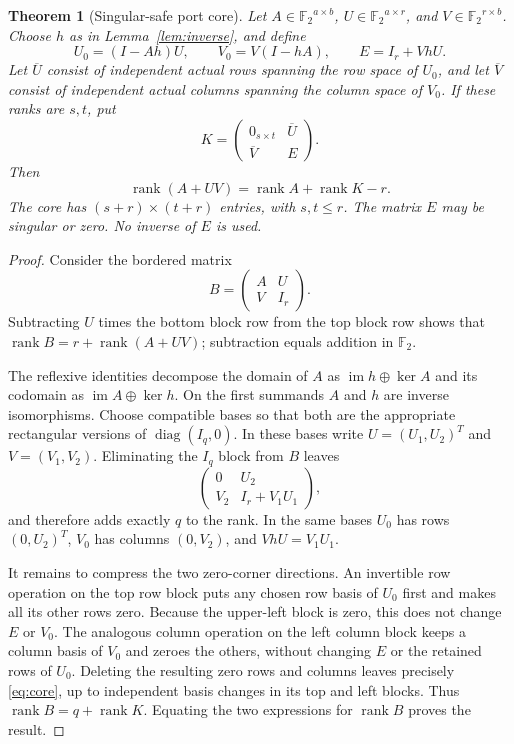 \documentclass[11pt,letterpaper]{article}
\newcommand{\F}{{\mathbb F_2}}
\newcommand{\rk}{\operatorname{rank}}
\newcommand{\im}{\operatorname{im}}
\newtheorem{theorem}{Theorem}[section]
\theoremstyle{definition}
\theoremstyle{remark}
\numberwithin{equation}{section}
\begin{document}
\begin{theorem}[Singular-safe port core]
\label{thm:border}
Let $A\in\F^{a\times b}$, $U\in\F^{a\times r}$, and
$V\in\F^{r\times b}$. Choose $h$ as in Lemma~\ref{lem:inverse}, and define
\begin{equation}
 U_0=(I-Ah)U,\qquad V_0=V(I-hA),\qquad E=I_r+VhU.
 \label{eq:residuals}
\end{equation}
Let $\overline U$ consist of independent actual rows spanning the row
space of $U_0$, and let $\overline V$ consist of independent actual
columns spanning the column space of $V_0$. If these ranks are $s,t$, put
\begin{equation}
 K=\begin{pmatrix}0_{s\times t}&\overline U\\
                   \overline V&E\end{pmatrix}.
 \label{eq:core}
\end{equation}
Then
\begin{equation}
 \boxed{\rk(A+UV)=\rk A+\rk K-r.}
 \label{eq:rankformula}
\end{equation}
The core has $(s+r)\times(t+r)$ entries, with $s,t\le r$. The matrix $E$
may be singular or zero. No inverse of $E$ is used.
\end{theorem}
\begin{proof}
Consider the bordered matrix
\[
 B=\begin{pmatrix}A&U\\V&I_r\end{pmatrix}.
\]
Subtracting $U$ times the bottom block row from the top block row shows
that $\rk B=r+\rk(A+UV)$; subtraction equals addition in $\F$.

The reflexive identities decompose the domain of $A$ as
$\im h\oplus\ker A$ and its codomain as $\im A\oplus\ker h$. On the
first summands $A$ and $h$ are inverse isomorphisms. Choose compatible
bases so that both are the appropriate rectangular versions of
$\operatorname{diag}(I_q,0)$. In these bases write
$U=(U_1,U_2)^T$ and $V=(V_1,V_2)$. Eliminating the $I_q$ block from $B$
leaves
\[
 \begin{pmatrix}0&U_2\\V_2&I_r+V_1U_1\end{pmatrix},
\]
and therefore adds exactly $q$ to the rank. In the same bases $U_0$ has
rows $(0,U_2)^T$, $V_0$ has columns $(0,V_2)$, and $VhU=V_1U_1$.

It remains to compress the two zero-corner directions. An invertible row
operation on the top row block puts any chosen row basis of $U_0$ first
and makes all its other rows zero. Because the upper-left block is zero,
this does not change $E$ or $V_0$. The analogous column operation on the
left column block keeps a column basis of $V_0$ and zeroes the others,
without changing $E$ or the retained rows of $U_0$. Deleting the resulting
zero rows and columns leaves precisely \eqref{eq:core}, up to independent
basis changes in its top and left blocks. Thus $\rk B=q+\rk K$.
Equating the two expressions for $\rk B$ proves the result.
\end{proof}
\end{document}

